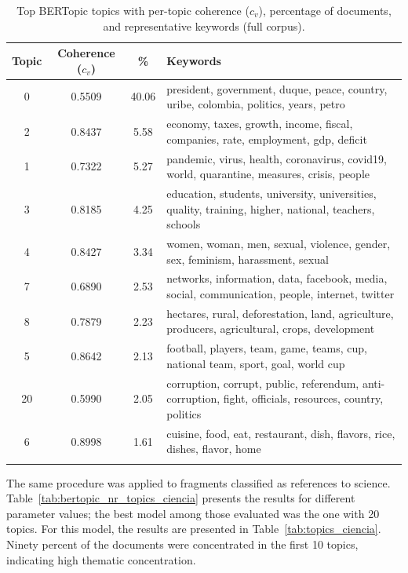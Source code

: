 \documentclass[pdflatex,sn-mathphys-num, iicol]{sn-jnl}
\begin{document}
	\begin{table}[h!]
		\centering
		\small
		\caption{Top BERTopic topics with per-topic coherence ($c_v$), percentage of documents, and representative keywords (full corpus).}
		\label{tab:bertopic_coherence_top}
		\begin{tabularx}{\textwidth}{@{}cccX@{}}
			\toprule
			\textbf{Topic} & \textbf{Coherence ($c_v$)} & \textbf{\%} & \textbf{Keywords} \\
			\midrule
			0  & 0.5509 & 40.06 & president, government, duque, peace, country, uribe, colombia, politics, years, petro \\
			2  & 0.8437 & 5.58  & economy, taxes, growth, income, fiscal, companies, rate, employment, gdp, deficit \\
			1  & 0.7322 & 5.27  & pandemic, virus, health, coronavirus, covid19, world, quarantine, measures, crisis, people \\
			3  & 0.8185 & 4.25  & education, students, university, universities, quality, training, higher, national, teachers, schools \\
			4  & 0.8427 & 3.34  & women, woman, men, sexual, violence, gender, sex, feminism, harassment, sexual \\
			7  & 0.6890 & 2.53  & networks, information, data, facebook, media, social, communication, people, internet, twitter \\
			8  & 0.7879 & 2.23  & hectares, rural, deforestation, land, agriculture, producers, agricultural, crops, development \\
			5  & 0.8642 & 2.13  & football, players, team, game, teams, cup, national team, sport, goal, world cup \\
			20 & 0.5990 & 2.05  & corruption, corrupt, public, referendum, anti-corruption, fight, officials, resources, country, politics \\
			6  & 0.8998 & 1.61  & cuisine, food, eat, restaurant, dish, flavors, rice, dishes, flavor, home \\
			\botrule
		\end{tabularx}
	\end{table}
	
	The same procedure was applied to fragments classified as references to science. 
	Table~\ref{tab:bertopic_nr_topics_ciencia} presents the results for different parameter values; the best model among those evaluated was the one with 20 topics. For this model, the results are presented in Table~\ref{tab:topics_ciencia}. Ninety percent of the documents were concentrated in the first 10 topics, indicating high thematic concentration.
	
\end{document}
